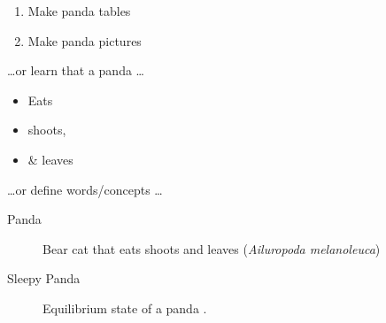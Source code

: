\documentclass[11pt, oneside]{article}   	%
\begin{document}
\begin{enumerate}
\item Make panda tables
\item Make panda pictures
\end{enumerate}

\dots or learn that a panda \dots
\begin{itemize}
\item Eats
\item shoots,
\item \& leaves
\end{itemize}

\dots or define words/concepts \dots
\begin{description}
\item[Panda]  Bear cat that eats shoots and leaves \cite{ref:pouty} (\textit{Ailuropoda melanoleuca}) \cite{ref:panda,ref:pouty}
\item[Sleepy Panda] Equilibrium state of a panda \cite{convert, access}.   \cite{access}              %
\end{description}




%
%
%



\end{document}
